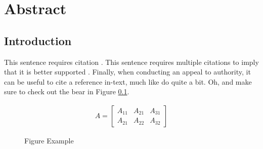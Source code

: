 %
%
\begingroup
\renewcommand{\cleardoublepage}{}
\renewcommand{\clearpage}{}
\chapter*{Abstract}\label{chap:abstract}
\renewcommand{\chapter}[2]{}%



\section{Introduction}
\label{sec:Abstract_Introduction}

This sentence requires citation \cite{Devlin2019}. This sentence requires multiple citations to imply that it is better supported \citep{Kim2016,Rajpurkar2016}. Finally, when conducting an appeal to authority, it can be useful to cite a reference in-text, much like \citep{Tenney2020} do quite a bit. Oh, and make sure to check out the bear in Figure \ref{fig:Abstract_FigureExample}.

\begin{figure}[ht]
	\begin{align}
	A = 
	\begin{bmatrix}
	A_{11} & A_{21} & A_{31} \\
	A_{21} & A_{22} & A_{32}
	\end{bmatrix}
	\end{align}
	\caption{Figure Example}
	\label{fig:Abstract_FigureExample}
\end{figure}

